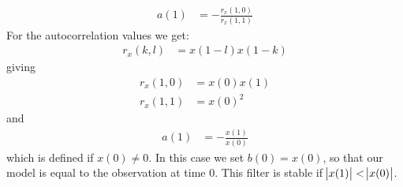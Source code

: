  \begin{align}
		a(1)&=-\frac{r_x(1,0)}{r_x(1,1)}
\end{align}
For the autocorrelation values we get:
\begin{align}
	r_x(k,l)&=x(1-l)x(1-k)	
\end{align}
giving
\begin{align}
	r_x(1,0)&=x(0)x(1)\\
	r_x(1,1)&=x(0)^2	
\end{align}
and
 \begin{align}
		a(1)&=-\frac{x(1)}{x(0)}
\end{align}
which is defined if $x(0)\neq 0$.
In this case we set $b(0)=x(0)$, so that our model is equal to the observation at time $0$.
This filter is stable if $\abs{x(1)}<\abs{x(0)}$.



